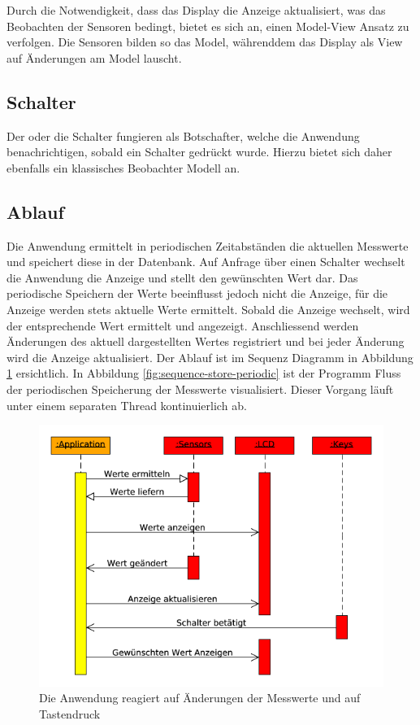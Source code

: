 \documentclass[
    10pt,
    a4paper,
]{scrartcl}
\begin{document}
Durch die Notwendigkeit, dass das Display die Anzeige aktualisiert, was das
Beobachten der Sensoren bedingt, bietet es sich an, einen Model-View Ansatz zu
verfolgen. Die Sensoren bilden so das Model, währenddem das Display als View
auf Änderungen am Model lauscht.

\subsection{Schalter}
Der oder die Schalter fungieren als Botschafter, welche die Anwendung benachrichtigen,
sobald ein Schalter gedrückt wurde. Hierzu bietet sich daher ebenfalls ein klassisches
Beobachter Modell an.

\subsection{Ablauf}

Die Anwendung ermittelt in periodischen Zeitabständen die aktuellen Messwerte und
speichert diese in der Datenbank. Auf Anfrage über einen Schalter wechselt die Anwendung
die Anzeige und stellt den gewünschten Wert dar. Das periodische Speichern der Werte
beeinflusst jedoch nicht die Anzeige, für die Anzeige werden stets aktuelle Werte
ermittelt. Sobald die Anzeige wechselt, wird der entsprechende Wert ermittelt und
angezeigt. Anschliessend werden Änderungen des aktuell dargestellten Wertes registriert
und bei jeder Änderung wird die Anzeige aktualisiert. Der Ablauf ist im Sequenz Diagramm
in Abbildung \ref{fig:sequence-startup-running} ersichtlich. In Abbildung
\ref{fig:sequence-store-periodic} ist der Programm Fluss der periodischen Speicherung der
Messwerte visualisiert. Dieser Vorgang läuft unter einem separaten Thread kontinuierlich
ab.

\begin{figure}[ht]
    \centering
    \includegraphics[width=.9\textwidth]{sequence-startup-running}
    \caption{Die Anwendung reagiert auf Änderungen der Messwerte und auf Tastendruck}
    \label{fig:sequence-startup-running}
\end{figure}
\end{document}
